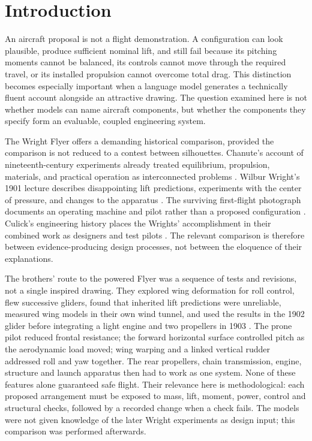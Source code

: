 \documentclass[10pt,letterpaper]{article}
\begin{document}
\section{Introduction}
An aircraft proposal is not a flight demonstration. A configuration can look plausible, produce sufficient nominal lift, and still fail because its pitching moments cannot be balanced, its controls cannot move through the required travel, or its installed propulsion cannot overcome total drag. This distinction becomes especially important when a language model generates a technically fluent account alongside an attractive drawing. The question examined here is not whether models can name aircraft components, but whether the components they specify form an evaluable, coupled engineering system.

The Wright Flyer offers a demanding historical comparison, provided the comparison is not reduced to a contest between silhouettes. Chanute's account of nineteenth-century experiments already treated equilibrium, propulsion, materials, and practical operation as interconnected problems \cite{ref1}. Wilbur Wright's 1901 lecture describes disappointing lift predictions, experiments with the center of pressure, and changes to the apparatus \cite{ref2}. The surviving first-flight photograph documents an operating machine and pilot rather than a proposed configuration \cite{ref4}. Culick's engineering history places the Wrights' accomplishment in their combined work as designers and test pilots \cite{ref5}. The relevant comparison is therefore between evidence-producing design processes, not between the eloquence of their explanations.

The brothers' route to the powered Flyer was a sequence of tests and revisions, not a single inspired drawing. They explored wing deformation for roll control, flew successive gliders, found that inherited lift predictions were unreliable, measured wing models in their own wind tunnel, and used the results in the 1902 glider before integrating a light engine and two propellers in 1903 \cite{ref2,ref35}. The prone pilot reduced frontal resistance; the forward horizontal surface controlled pitch as the aerodynamic load moved; wing warping and a linked vertical rudder addressed roll and yaw together. The rear propellers, chain transmission, engine, structure and launch apparatus then had to work as one system. None of these features alone guaranteed safe flight. Their relevance here is methodological: each proposed arrangement must be exposed to mass, lift, moment, power, control and structural checks, followed by a recorded change when a check fails. The models were not given knowledge of the later Wright experiments as design input; this comparison was performed afterwards.
\end{document}
